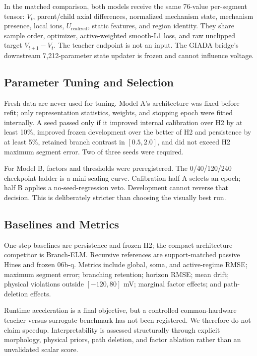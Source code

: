 \documentclass[11pt]{article}
\begin{document}
In the matched comparison, both models receive the same 76-value per-segment
tensor: $V_t$, parent/child axial differences, normalized mechanism state,
mechanism presence, local ions, $U_{\mathrm{realized}}$, static features, and
region identity. They share sample order, optimizer, active-weighted smooth-L1
loss, and raw unclipped target $V_{t+1}-V_t$. The teacher endpoint is not an
input. The GIADA bridge's downstream 7,212-parameter state updater is frozen
and cannot influence voltage.

\subsection{Parameter Tuning and Selection}

Fresh data are never used for tuning. Model A's architecture was fixed before
refit; only representation statistics, weights, and stopping epoch were fitted
internally. A seed passed only if it improved internal calibration over H2 by
at least 10\%, improved frozen development over the better of H2 and
persistence by at least 5\%, retained branch contrast in $[0.5,2.0]$, and did
not exceed H2 maximum segment error. Two of three seeds were required.

For Model B, factors and thresholds were preregistered. The 0/40/120/240
checkpoint ladder is a mini scaling curve. Calibration half A selects an epoch;
half B applies a no-seed-regression veto. Development cannot reverse that
decision. This is deliberately stricter than choosing the visually best run.

\subsection{Baselines and Metrics}

One-step baselines are persistence and frozen H2; the compact architecture
competitor is Branch-ELM. Recursive references are support-matched passive
Hines and frozen 06b-q. Metrics include global, soma, and active-regime RMSE;
maximum segment error; branching retention; horizon RMSE; mean drift; physical
violations outside $[-120,80]$ mV; marginal factor effects; and path-deletion
effects.

Runtime acceleration is a final objective, but a controlled common-hardware
teacher-versus-surrogate benchmark has not been registered. We therefore do
not claim speedup. Interpretability is assessed structurally through explicit
morphology, physical priors, path deletion, and factor ablation rather than an
unvalidated scalar score.
\end{document}
